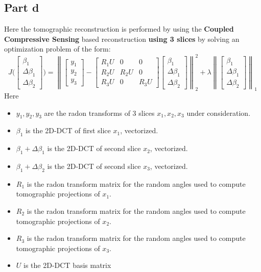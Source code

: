 \documentclass[12pt]{article}
\newcommand{\norm}[1]{\left\lVert #1 \right\rVert}
\begin{document}
\subsection*{Part d}
Here the tomographic reconstruction is performed by using the \textbf{Coupled Compressive Sensing} based reconstruction \textbf{using 3 slices} by solving an optimization problem of the form:
$$J\bigg(\begin{bmatrix}
\beta_1 \\ \Delta \beta_1 \\ \Delta \beta_2
\end{bmatrix}\bigg) = \norm{\begin{bmatrix}
	y_1\\y_2\\y_3
	\end{bmatrix} - \begin{bmatrix}
	R_1U & 0 & 0\\
	R_2U & R_2U & 0\\
	R_3U & 0 & R_3U
	\end{bmatrix} \begin{bmatrix}
	\beta_1 \\ \Delta \beta_1\\ \Delta \beta_2
	\end{bmatrix}}_2^2 + \lambda \norm{\begin{bmatrix}
	\beta_1 \\ \Delta \beta_1\\ \Delta \beta_2
	\end{bmatrix}}_1$$
Here 
\begin{itemize}
	\item  $y_1, y_2, y_3$ are the radon transforms of 3 slices $x_1, x_2, x_3$ under consideration.
	\item $\beta_1$ is the 2D-DCT of first slice $x_1$, vectorized.
	\item $\beta_1 + \Delta \beta_1$ is the 2D-DCT of second slice $x_2$, vectorized.
	\item $\beta_1 + \Delta \beta_2$ is the 2D-DCT of second slice $x_3$, vectorized.
	\item $R_1$ is the radon transform matrix for the random angles used to compute tomographic projections of $x_1$.
	\item $R_2$ is the radon transform matrix for the random angles used to compute tomographic projections of $x_2$.
	\item $R_3$ is the radon transform matrix for the random angles used to compute tomographic projections of $x_3$.
	\item $U$ is the 2D-DCT basis matrix
\end{itemize}
\end{document}
